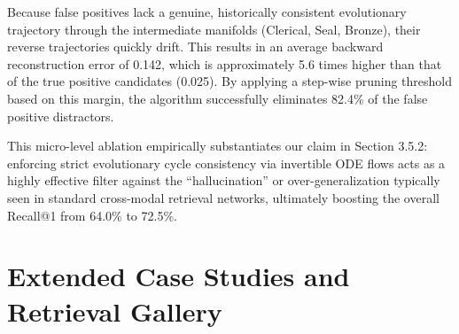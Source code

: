 \documentclass{article}
\newcommand{\cg}[1]{\begin{CJK*}{UTF8}{gbsn}#1\end{CJK*}}
\begin{document}
Because false positives lack a genuine, historically consistent evolutionary trajectory through the intermediate manifolds (Clerical, Seal, Bronze), their reverse trajectories quickly drift. This results in an average backward reconstruction error of 0.142, which is approximately 5.6 times higher than that of the true positive candidates (0.025). By applying a step-wise pruning threshold based on this margin, the algorithm successfully eliminates 82.4\% of the false positive distractors. 

This micro-level ablation empirically substantiates our claim in Section 3.5.2: enforcing strict evolutionary cycle consistency via invertible ODE flows acts as a highly effective filter against the ``hallucination'' or over-generalization typically seen in standard cross-modal retrieval networks, ultimately boosting the overall Recall@1 from 64.0\% to 72.5\%.







\section{Extended Case Studies and Retrieval Gallery}



\end{document}

